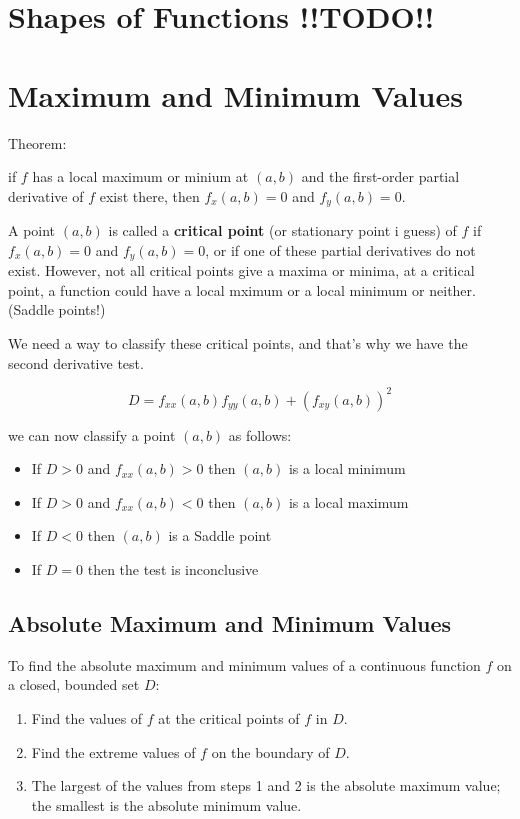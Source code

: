 \documentclass{article}
\begin{document}
\newpage
\section{Shapes of Functions !!TODO!!}

\newpage
\section{Maximum and Minimum Values}

Theorem:
\begin{center}
    if $f$ has a local maximum or minium at $(a,b)$ and the first-order partial derivative of $f$ exist there, then $f_x(a,b) = 0$ and $f_y(a,b) = 0$.
\end{center}

A point $(a,b)$ is called a \textbf{critical point} (or stationary point i guess) of $f$ if $f_x(a,b) = 0$ and $f_y(a,b) = 0$, or if one of these partial derivatives do not exist. However, not all critical points give a maxima or minima, at a critical point, a function could have a local mximum or a local minimum or neither. (Saddle points!) 

We need a way to classify these critical points, and that's why we have the second derivative test.


$$D = f_{xx}(a,b)f_{yy}(a,b) + (f_{xy}(a,b))^2$$

we can now classify a point $(a,b)$ as follows:

\begin{itemize}
    \item If $D > 0$ and $f_{xx}(a,b) >0$ then $(a,b)$ is a local minimum
    \item If $D>0$ and $f_{xx}(a,b)<0$ then $(a,b)$ is a local maximum
    \item If $D<0$ then $(a,b)$ is a Saddle point
    \item If $D=0$ then the test is inconclusive
\end{itemize}

\subsection{Absolute Maximum and Minimum Values}

To find the absolute maximum and minimum values of a continuous function $f$ on a closed, bounded set $D$:

\begin{enumerate}
    \item Find the values of $f$ at the critical points of $f$ in $D$.
    \item Find the extreme values of $f$ on the boundary of $D$.
    \item The largest of the values from steps 1 and 2 is the absolute maximum value; the smallest is the absolute minimum value.
\end{enumerate}
\end{document}

